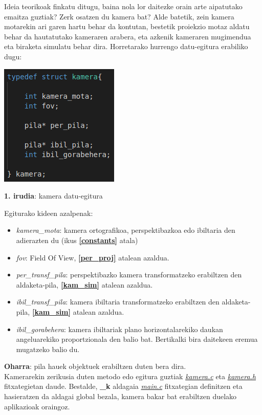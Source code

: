 \documentclass[12pt]{article}
\newcommand{\fitxategi}[1] {\underline{\textit{#1}}}
\newcommand{\aldagai}[1] {\textit{#1}}
\newcommand{\erref}[1] {\textbf{\ref{#1}}}
\begin{document}
Ideia teorikoak finkatu ditugu, baina nola lor daitezke orain arte aipatutako emaitza guztiak? Zerk osatzen du kamera bat?
Alde batetik, zein kamera motarekin ari garen hartu behar da kontutan, bestetik proiekzio motaz aldatu behar da hautatutako kameraren arabera, eta azkenik kameraren mugimendua eta biraketa simulatu behar dira. Horretarako hurrengo datu-egitura erabiliko dugu:

\begin{center}
\includegraphics[scale=0.7]{kamera_struct.png}

\textbf{1. irudia}: kamera datu-egitura
\end{center}


Egiturako kideen azalpenak:

\begin{itemize}
\item \aldagai{kamera\_mota}: kamera ortografikoa, perspektibazkoa edo ibiltaria den adierazten du (ikus \erref{constants} atala)
\item \aldagai{fov}: Field Of View\cite{fov}, \erref{per_proj} atalean azaldua.
\item \aldagai{per\_transf\_pila}: perspektibazko kamera transformatzeko erabiltzen den aldaketa-pila, \erref{kam_sim} atalean azaldua.
\item \aldagai{ibil\_transf\_pila}: kamera ibiltaria transformatzeko erabiltzen den aldaketa-pila, \erref{kam_sim} atalean azaldua.
\item \aldagai{ibil\_gorabehera}: kamera ibiltariak plano horizontalarekiko daukan angeluarekiko proportzionala den balio bat. Bertikalki bira daitekeen eremua mugatzeko balio du.
\end{itemize}

\textbf{Oharra}: pila hauek objektuek erabiltzen duten bera dira.\\

Kamerarekin zerikusia duten metodo edo egitura guztiak \fitxategi{kamera.c} eta \fitxategi{kamera.h} fitxategietan daude.
Bestalde, \textbf{\_k} aldagaia \fitxategi{main.c} fitxategian definitzen eta hasieratzen da aldagai global bezala, kamera bakar bat erabiltzen duelako aplikazioak oraingoz.
\end{document}
